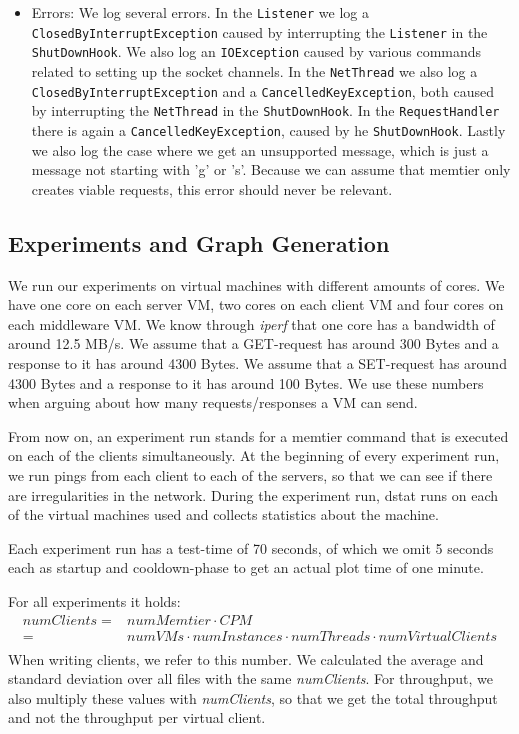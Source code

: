 \documentclass[11pt,a4paper]{article}
\newcommand{\co}[1]{\texttt{#1}}
\newcommand{\ku}[1]{\textit{#1}}
\begin{document}
\begin{itemize}
	\item Errors: We log several errors. In the \co{Listener} we log a \co{ClosedByInterruptException} caused by interrupting the \co{Listener} in the \co{ShutDownHook}. We also log an \co{IOException} caused by various commands related to setting up the socket channels. In the \co{NetThread} we also log a \co{ClosedByInterruptException} and a \co{CancelledKeyException}, both caused by interrupting the \co{NetThread} in the \co{ShutDownHook}. In the \co{RequestHandler} there is again a \co{CancelledKeyException}, caused by he \co{ShutDownHook}. Lastly we also log the case where we get an unsupported message, which is just a message not starting with 'g' or 's'. Because we can assume that memtier only creates viable requests, this error should never be relevant.
\end{itemize}

\subsection{Experiments and Graph Generation}
We run our experiments on virtual machines with different amounts of cores. We have one core on each server VM, two cores on each client VM and four cores on each middleware VM. We know through \ku{iperf} that one core has a bandwidth of around 12.5 MB/s. We assume that a GET-request has around 300 Bytes and a response to it has around 4300 Bytes. We assume that a SET-request has around 4300 Bytes and a response to it has around 100 Bytes. We use these numbers when arguing about how many requests/responses a VM can send. 

From now on, an experiment run stands for a memtier command that is executed on each of the clients simultaneously. At the beginning of every experiment run, we run pings from each client to each of the servers, so that we can see if there are irregularities in the network. During the experiment run, dstat runs on each of the virtual machines used and collects statistics about the machine.

Each experiment run has a test-time of 70 seconds, of which we omit 5 seconds each as startup and cooldown-phase to get an actual plot time of one minute. 

For all experiments it holds:
\begin{equation}
	\begin{split}
	numClients 	= & numMemtier \cdot CPM \\
						= & numVMs \cdot numInstances \cdot numThreads \cdot numVirtualClients\\
	\end{split}
\end{equation}
When writing clients, we refer to this number.
We calculated the average and standard deviation over all files with the same \ku{numClients}. For throughput, we also multiply these values with \ku{numClients}, so that we get the total throughput and not the throughput per virtual client.  
\end{document}
